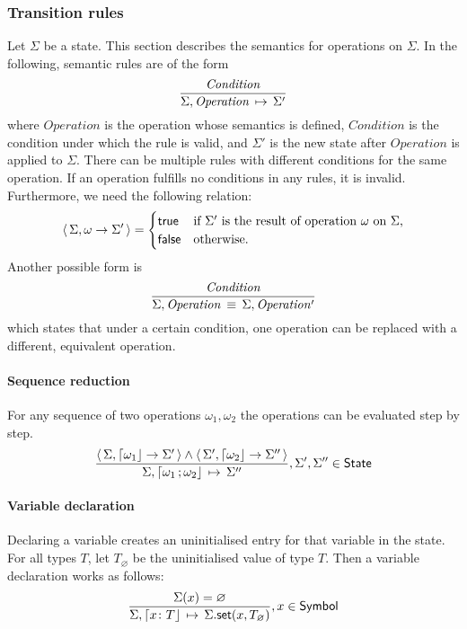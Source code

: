 \subsubsection{Transition rules}
Let $\Sigma$ be a state.
This section describes the semantics for operations on $\Sigma$.
In the following, semantic rules are of the form
	$$\frac{\mathit{Condition}}{{\Sigma, \mathit{Operation}} \,\mapsto\, \Sigma'}$$
	where
		$\mathit{Operation}$ is the operation whose semantics is defined,
		$\mathit{Condition}$ is the condition under which the rule is valid, and
		$\Sigma'$ is the new state after $\mathit{Operation}$ is applied to $\Sigma$.
There can be multiple rules with different conditions for the same operation.
If an operation fulfills no conditions in any rules, it is invalid.
Furthermore, we need the following relation:
$$\left\langle\, \Sigma, \omega \to \Sigma' \,\right\rangle = \begin{cases}
	\mathsf{true} & \text{if $\Sigma'$ is the result of operation $\omega$ on $\Sigma$,} \\
	\mathsf{false} & \text{otherwise.}
\end{cases}
$$
Another possible form is
$$
\frac{\mathit{Condition}}{\Sigma, \mathit{Operation} \,\equiv\, \Sigma, \mathit{Operation'}}
$$
which states that under a certain condition, one operation can be replaced with a different, equivalent operation.

\paragraph{Sequence reduction}
For any sequence of two operations $\omega_1, \omega_2$ the operations can be evaluated step by step.
$$
\semrule{
	\results{\Sigma}{\stmt{\omega_1}}{\Sigma'} \land
	\results{\Sigma'}{\stmt{\omega_2}}{\Sigma''}}
	{\Sigma, \stmt{\omega_1}{\omega_2}}
	{\Sigma''},
	\Sigma', \Sigma'' \in \State
$$

\paragraph{Variable declaration}
Declaring a variable creates an uninitialised entry for that variable in the state.
For all types $T$, let $T_\varnothing$ be the uninitialised value of type $T$.
Then a variable declaration works as follows:
$$
\semrule
	{\Sigma(x) = \varnothing}
	{\Sigma, \stmt{\varv{x}{T}}}
	{\StSet{\Sigma}{x}{T_\varnothing}},
		x \in \Symbol
$$

